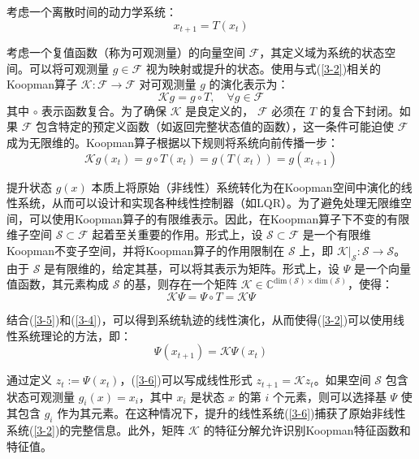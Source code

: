 \documentclass[lang=chs, degree=master, blindreview=false, winfonts=true]{yanputhesis}
\begin{document}
考虑一个离散时间的动力学系统：
\begin{equation}
	x_{t+1} = T(x_t)\label{3-2}
\end{equation}

考虑一个复值函数（称为可观测量）的向量空间 \( \mathcal{F} \)，其定义域为系统的状态空间。可以将可观测量 \( g \in \mathcal{F} \) 视为映射或提升的状态。使用与式(\ref{3-2})相关的Koopman算子 \( \mathcal{K}: \mathcal{F} \to \mathcal{F} \) 对可观测量 \( g \) 的演化表示为：
\begin{equation}
	\mathcal{K}g = g \circ T, \quad \forall g \in \mathcal{F}
	\label{3-3}
\end{equation}
其中 \( \circ \) 表示函数复合。为了确保 \( \mathcal{K} \) 是良定义的， \( \mathcal{F} \) 必须在 \( T \) 的复合下封闭。如果 \( \mathcal{F} \) 包含特定的预定义函数（如返回完整状态值的函数），这一条件可能迫使 \( \mathcal{F} \) 成为无限维的。Koopman算子根据以下规则将系统向前传播一步：
\begin{equation}
	\mathcal{K}g(x_t) = g \circ T(x_t) = g(T(x_t)) = g(x_{t+1})
	\label{3-4}
\end{equation}

提升状态 \( g(x) \) 本质上将原始（非线性）系统转化为在Koopman空间中演化的线性系统，从而可以设计和实现各种线性控制器（如LQR）。为了避免处理无限维空间，可以使用Koopman算子的有限维表示。因此，在Koopman算子下不变的有限维子空间 \( \mathcal{S} \subset \mathcal{F} \) 起着至关重要的作用。形式上，设 \( \mathcal{S} \subset \mathcal{F} \) 是一个有限维Koopman不变子空间，并将Koopman算子的作用限制在 \( \mathcal{S} \) 上，即 \( \mathcal{K} \rvert_\mathcal{S}: \mathcal{S} \to \mathcal{S} \)。由于 \( \mathcal{S} \) 是有限维的，给定其基，可以将其表示为矩阵。形式上，设 \( \Psi \) 是一个向量值函数，其元素构成 \( \mathcal{S} \) 的基，则存在一个矩阵 \( \mathcal{K} \in \mathbb{C}^{\text{dim}(\mathcal{S}) \times \text{dim}(\mathcal{S})} \)，使得：
\begin{equation}
	\mathcal{K}\Psi = \Psi \circ T = \mathcal{K}\Psi
	\label{3-5}
\end{equation}

结合(\ref{3-5})和(\ref{3-4})，可以得到系统轨迹的线性演化，从而使得(\ref{3-2})可以使用线性系统理论的方法，即：
\begin{equation}
	\Psi(x_{t+1}) = \mathcal{K}\Psi(x_t)\label{3-6}
\end{equation}

通过定义 \( z_t := \Psi(x_t) \)，(\ref{3-6})可以写成线性形式 \( z_{t+1} = \mathcal{K}z_t \)。如果空间 \( \mathcal{S} \) 包含状态可观测量 \( g_i(x) = x_i \)，其中 \( x_i \) 是状态 \( x \) 的第 \( i \) 个元素，则可以选择基 \( \Psi \) 使其包含 \( g_i \) 作为其元素。在这种情况下，提升的线性系统(\ref{3-6})捕获了原始非线性系统(\ref{3-2})的完整信息。此外，矩阵 \( \mathcal{K} \) 的特征分解允许识别Koopman特征函数和特征值。
\end{document}
